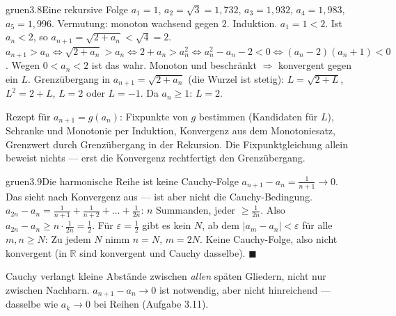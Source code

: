 \begin{loesungkarte}{gruen}{3.8}{Eine rekursive Folge}
$a_1 = 1$, $a_2 = \sqrt3 = 1{,}732$, $a_3 = 1{,}932$, $a_4 = 1{,}983$, $a_5 = 1{,}996$. Vermutung: monoton wachsend gegen $2$.
Induktion. $a_1 = 1 < 2$. Ist $a_n < 2$, so $a_{n+1} = \sqrt{2 + a_n} < \sqrt4 = 2$. \checkmark
{}
$a_{n+1} > a_n\iff\sqrt{2 + a_n} > a_n\iff2 + a_n > a_n^{2}\iff a_n^{2} - a_n - 2 < 0\iff(a_n - 2)(a_n + 1) < 0$. Wegen $0 < a_n < 2$ ist das wahr. \checkmark
{}
Monoton und beschränkt $\Rightarrow$ konvergent gegen ein $L$. Grenzübergang in $a_{n+1} = \sqrt{2 + a_n}$ (die Wurzel ist stetig): $L = \sqrt{2 + L}$, $L^{2} = 2 + L$, $L = 2$ oder $L = -1$. Da $a_n\ge1$: $L = 2$.
\begin{mitnehmen}\kastentext
Rezept für $a_{n+1} = g(a_n)$: Fixpunkte von $g$ bestimmen (Kandidaten für $L$), Schranke und Monotonie per Induktion, Konvergenz aus dem Monotoniesatz, Grenzwert durch Grenzübergang in der Rekursion. Die Fixpunktgleichung allein beweist nichts --- erst die Konvergenz rechtfertigt den Grenzübergang.
\end{mitnehmen}
\end{loesungkarte}

\begin{loesungkarte}{gruen}{3.9}{Die harmonische Reihe ist keine Cauchy-Folge}
$a_{n+1} - a_n = \frac1{n + 1}\to0$. Das sieht nach Konvergenz aus --- ist aber nicht die Cauchy-Bedingung.
$a_{2n} - a_n = \frac1{n + 1} + \frac1{n + 2} + \dots + \frac1{2n}$: $n$ Summanden, jeder $\ge\frac1{2n}$. Also $a_{2n} - a_n\ge n\cdot\frac1{2n} = \frac12$.
Für $\varepsilon = \frac12$ gibt es kein $N$, ab dem $|a_m - a_n| < \varepsilon$ für alle $m, n\ge N$: Zu jedem $N$ nimm $n = N$, $m = 2N$. Keine Cauchy-Folge, also nicht konvergent (in $\mathbb R$ sind konvergent und Cauchy dasselbe). $\blacksquare$
\begin{mitnehmen}\kastentext
Cauchy verlangt kleine Abstände zwischen \emph{allen} späten Gliedern, nicht nur zwischen Nachbarn. $a_{n+1} - a_n\to0$ ist notwendig, aber nicht hinreichend --- dasselbe wie $a_k\to0$ bei Reihen (Aufgabe 3.11).
\end{mitnehmen}
\end{loesungkarte}

